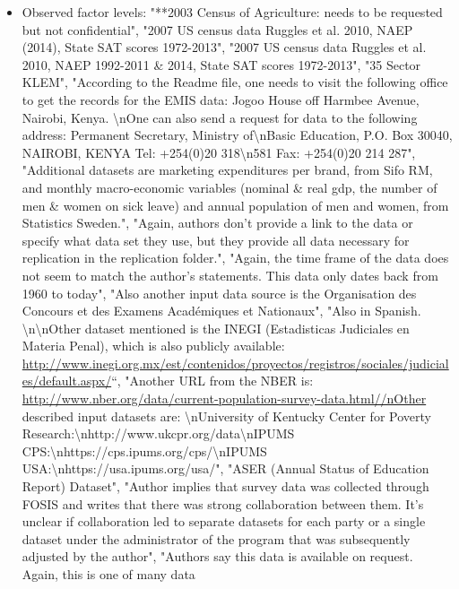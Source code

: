 \documentclass[]{article}
\providecommand{\tightlist}{%
  \setlength{\itemsep}{0pt}\setlength{\parskip}{0pt}}
\begin{document}
\begin{itemize}
\tightlist
\item
  Observed factor levels: "**2003 Census of Agriculture: needs to be
  requested but not confidential", "2007 US census data Ruggles et al.
  2010, NAEP (2014), State SAT scores 1972-2013", "2007 US census data
  Ruggles et al. 2010, NAEP 1992-2011 \& 2014, State SAT scores
  1972-2013", "35 Sector KLEM", "According to the Readme file, one needs
  to visit the following office to get the records for the EMIS data:
  Jogoo House off Harmbee Avenue, Nairobi, Kenya. \textbackslash{}nOne
  can also send a request for data to the following address: Permanent
  Secretary, Ministry of\textbackslash{}nBasic Education, P.O. Box
  30040, NAIROBI, KENYA Tel: +254(0)20 318\textbackslash{}n581 Fax:
  +254(0)20 214 287", "Additional datasets are marketing expenditures
  per brand, from Sifo RM, and monthly macro-economic variables (nominal
  \& real gdp, the number of men \& women on sick leave) and annual
  population of men and women, from Statistics Sweden.", "Again, authors
  don't provide a link to the data or specify what data set they use,
  but they provide all data necessary for replication in the replication
  folder.", "Again, the time frame of the data does not seem to match
  the author's statements. This data only dates back from 1960 to
  today", "Also another input data source is the Organisation des
  Concours et des Examens Académiques et Nationaux", "Also in Spanish.
  \textbackslash{}n\textbackslash{}nOther dataset mentioned is the INEGI
  (Estadisticas Judiciales en Materia Penal), which is also publicly
  available:
  \url{http://www.inegi.org.mx/est/contenidos/proyectos/registros/sociales/judiciales/default.aspx/}``,
  "Another URL from the NBER is:
  \url{http://www.nber.org/data/current-population-survey-data.html//nOther}
  described input datasets are: \textbackslash{}nUniversity of Kentucky
  Center for Poverty
  Research:\textbackslash{}nhttp://www.ukcpr.org/data\textbackslash{}nIPUMS
  CPS:\textbackslash{}nhttps://cps.ipums.org/cps/\textbackslash{}nIPUMS
  USA:\textbackslash{}nhttps://usa.ipums.org/usa/", "ASER (Annual Status
  of Education Report) Dataset", "Author implies that survey data was
  collected through FOSIS and writes that there was strong collaboration
  between them. It's unclear if collaboration led to separate datasets
  for each party or a single dataset under the administrator of the
  program that was subsequently adjusted by the author", "Authors say
  this data is available on request. Again, this is one of many data

\end{itemize}
\end{document}

